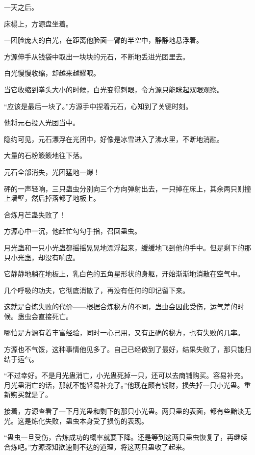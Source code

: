 
\begin{this_body}



一天之后。

床榻上，方源盘坐着。

一团脸庞大的白光，在距离他脸面一臂的半空中，静静地悬浮着。

方源伸手从钱袋中取出一块块的元石，不断地丢进光团里去。

白光慢慢收缩，却越来越耀眼。

当它收缩到拳头大小的时候，白光变得刺眼，令方源只能眯起双眼观察。

“应该是最后一块了。”方源手中捏着元石，心知到了关键时刻。

他将元石投入光团当中。

隐约可见，元石漂浮在光团中，好像是冰雪进入了沸水里，不断地消融。

大量的石粉簌簌地往下落。

元石全部消失，光团猛地一爆！

砰的一声轻响，三只蛊虫分别向三个方向弹射出去，一只掉在床上，其余两只则撞上墙壁，然后掉落都了地板上。

合炼月芒蛊失败了！

方源心中一沉，他赶忙勾勾手指，召回蛊虫。

月光蛊和一只小光蛊都摇摇晃晃地漂浮起来，缓缓地飞到他的手中。但是剩下的那只小光蛊，却没有响应。

它静静地躺在地板上，乳白色的五角星形状的身躯，开始渐渐地消散在空气中。

几个呼吸的功夫，它彻底消散了，再没有任何的印记留下来。

这就是合炼失败的代价——根据合炼秘方的不同，蛊虫会因此受伤，运气差的时候。蛊虫会直接死亡。

哪怕是方源有着丰富经验，同时一心己用，又有正确的秘方，也有失败的几率。

方源也不气馁，这种事情他见多了。自己已经做到了最好，结果失败了，那只能归结于运气。

“不过幸好。不是月光蛊消亡，小光蛊死掉一只，还可以去商铺购买。容易补充。月光蛊消亡的话，那就不能轻易补充了。”他现在颇有钱财，损失掉一只小光蛊。重新购买就是了。

接着，方源查看了一下月光蛊和剩下的那只小光蛊。两只蛊的表面，都有些黯淡无光。这是炼化失败，蛊虫本身受了损伤的表现。

“蛊虫一旦受伤，合炼成功的概率就要下降。还是等到这两只蛊虫恢复了，再继续合炼吧。”方源深知欲速则不达的道理，将这两只蛊收了起来。


\end{this_body}
